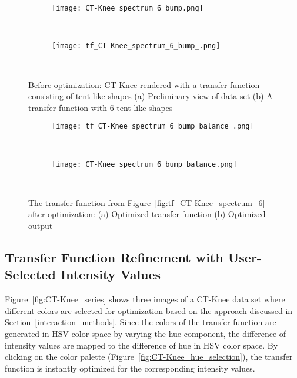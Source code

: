 \begin{figure}
\centering

\begin{subfigure}{0.33\textwidth}
\texttt{[image: CT-Knee\_spectrum\_6\_bump.png]}
\caption{~}
\end{subfigure}
\begin{subfigure}{0.33\textwidth}
\texttt{[image: tf\_CT-Knee\_spectrum\_6\_bump\_.png]}
\caption{~}
\label{fig:tf_CT-Knee_spectrum_6_bump_}
\end{subfigure}
\caption{Before optimization: CT-Knee rendered with a transfer function consisting 
of tent-like shapes (a) Preliminary view of data set (b) A transfer function with 6 tent-like shapes}
\label{fig:tf_CT-Knee_spectrum_6}

\begin{subfigure}{0.33\textwidth}
\texttt{[image: tf\_CT-Knee\_spectrum\_6\_bump\_balance\_.png]}
\caption{~}
\end{subfigure}
\begin{subfigure}{0.33\textwidth}
\texttt{[image: CT-Knee\_spectrum\_6\_bump\_balance.png]}
\caption{~}
\end{subfigure}
\caption{The transfer function from Figure~\ref{fig:tf_CT-Knee_spectrum_6} after optimization: (a) Optimized transfer function (b) Optimized output}
\label{fig:tf_CT-Knee_spectrum_6_balance_1000}
\end{figure}

\subsection{Transfer Function Refinement with User-Selected Intensity Values}
Figure~\ref{fig:CT-Knee_series} shows three images of a CT-Knee data set where different colors are selected for optimization based on the approach discussed in Section~\ref{interaction_methods}. Since the colors of the transfer function are generated in HSV color space by varying the hue component, the difference of intensity values are mapped to the difference of hue in HSV color space. By clicking on the color palette (Figure~\ref{fig:CT-Knee_hue_selection}), the transfer function is instantly optimized for the corresponding intensity values.


